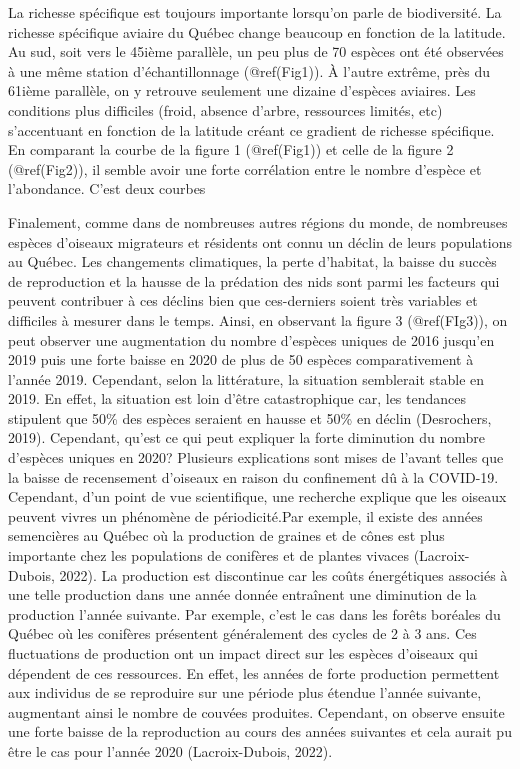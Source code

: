 \documentclass[
]{article}
\begin{document}
La richesse spécifique est toujours importante lorsqu'on parle de
biodiversité. La richesse spécifique aviaire du Québec change beaucoup
en fonction de la latitude. Au sud, soit vers le 45ième parallèle, un
peu plus de 70 espèces ont été observées à une même station
d'échantillonnage (@ref(Fig1)). À l'autre extrême, près du 61ième
parallèle, on y retrouve seulement une dizaine d'espèces aviaires. Les
conditions plus difficiles (froid, absence d'arbre, ressources limités,
etc) s'accentuant en fonction de la latitude créant ce gradient de
richesse spécifique. En comparant la courbe de la figure 1 (@ref(Fig1))
et celle de la figure 2 (@ref(Fig2)), il semble avoir une forte
corrélation entre le nombre d'espèce et l'abondance. C'est deux courbes

Finalement, comme dans de nombreuses autres régions du monde, de
nombreuses espèces d'oiseaux migrateurs et résidents ont connu un déclin
de leurs populations au Québec. Les changements climatiques, la perte
d'habitat, la baisse du succès de reproduction et la hausse de la
prédation des nids sont parmi les facteurs qui peuvent contribuer à ces
déclins bien que ces-derniers soient très variables et difficiles à
mesurer dans le temps. Ainsi, en observant la figure 3 (@ref(FIg3)), on
peut observer une augmentation du nombre d'espèces uniques de 2016
jusqu'en 2019 puis une forte baisse en 2020 de plus de 50 espèces
comparativement à l'année 2019. Cependant, selon la littérature, la
situation semblerait stable en 2019. En effet, la situation est loin
d'être catastrophique car, les tendances stipulent que 50\% des espèces
seraient en hausse et 50\% en déclin (Desrochers, 2019). Cependant,
qu'est ce qui peut expliquer la forte diminution du nombre d'espèces
uniques en 2020? Plusieurs explications sont mises de l'avant telles que
la baisse de recensement d'oiseaux en raison du confinement dû à la
COVID-19. Cependant, d'un point de vue scientifique, une recherche
explique que les oiseaux peuvent vivres un phénomène de périodicité.Par
exemple, il existe des années semencières au Québec où la production de
graines et de cônes est plus importante chez les populations de
conifères et de plantes vivaces (Lacroix-Dubois, 2022). La production
est discontinue car les coûts énergétiques associés à une telle
production dans une année donnée entraînent une diminution de la
production l'année suivante. Par exemple, c'est le cas dans les forêts
boréales du Québec où les conifères présentent généralement des cycles
de 2 à 3 ans. Ces fluctuations de production ont un impact direct sur
les espèces d'oiseaux qui dépendent de ces ressources. En effet, les
années de forte production permettent aux individus de se reproduire sur
une période plus étendue l'année suivante, augmentant ainsi le nombre de
couvées produites. Cependant, on observe ensuite une forte baisse de la
reproduction au cours des années suivantes et cela aurait pu être le cas
pour l'année 2020 (Lacroix-Dubois, 2022).
\end{document}
